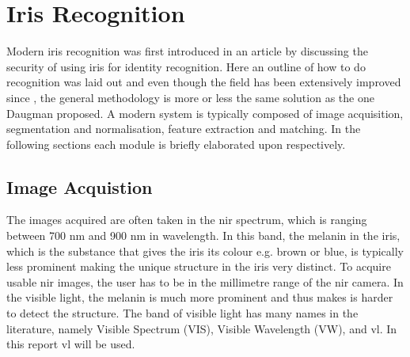 \section{Iris Recognition}
\label{sec:Iris_Recognition_Research}
Modern iris recognition was first introduced in an article by \cite{Daugman1993} discussing the security of using iris for identity recognition. Here an outline of how to do recognition was laid out and even though the field has been extensively improved since \cite{Daugman1993}, the general methodology is more or less the same solution as the one Daugman proposed. A modern system is typically composed of image acquisition, segmentation and normalisation, feature extraction and matching. In the following sections each module is briefly elaborated upon respectively.

\subsection{Image Acquistion}
The images acquired are often taken in the \gls{nir} spectrum, which is ranging between 700 nm and 900 nm in wavelength. In this band, the melanin in the iris, which is the substance that gives the iris its colour e.g. brown or blue, is typically less prominent making the unique structure in the iris very distinct. To acquire usable \gls{nir} images, the user has to be in the millimetre range of the \gls{nir} camera. In the visible light, the melanin is much more prominent and thus makes is harder to detect the structure. The band of visible light has many names in the literature, namely Visible Spectrum (VIS), Visible Wavelength (VW), and \gls{vl}. In this report \gls{vl} will be used. 

